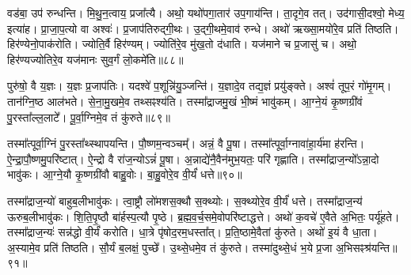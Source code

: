 वड॑बा॒ उप॑ रुन्धन्ति।
मि॒थु॒न॒त्वाय॒ प्रजा᳚त्यै।
अथो॒ यथो॑पगा॒तार॑ उप॒गाय॑न्ति।
ता॒दृगे॒व तत्।
उद॑गासी॒दश्वो॒ मेध्य॒ इत्या॑ह।
प्रा॒जा॒प॒त्यो वा अश्वः॑।
प्र॒जाप॑तिरुद्गी॒थः।
उ॒द्गी॒थमे॒वाव॑ रुन्धे।
अथो॑ ऋख्सा॒मयो॑रे॒व प्रति॑ तिष्ठति।
हिर॑ण्येनो॒पाक॑रोति।
ज्योति॒र्वै हिर॑ण्यम्।
ज्योति॑रे॒व मु॑ख॒तो द॑धाति।
यज॑माने च प्र॒जासु॑ च।
अथो॒ हिर॑ण्यज्योतिरे॒व यज॑मानः सुव॒र्गं लो॒कमे॑ति॥८८॥\anuvakamend[तथ्स उ॒पाक॑रोति च॒त्वारि॑ च]

पुरु॑षो॒ वै य॒ज्ञः।
य॒ज्ञः प्र॒जाप॑तिः।
यदश्वे॑ प॒शून्नि॑यु॒ञ्जन्ति॑।
य॒ज्ञादे॒व तद्य॒ज्ञं प्रयु॑ङ्क्ते।
अश्वं॑ तूप॒रं गो॑मृ॒गम्।
तान॑ग्नि॒ष्ठ आल॑भते।
से॒ना॒मु॒खमे॒व तथ्सꣴश्य॑ति।
तस्मा᳚द्राजमु॒खं भी॒ष्मं भावु॑कम्।
आ॒ग्ने॒यं कृ॒ष्णग्री॑वं पु॒रस्ता᳚ल्ल॒लाटे᳚।
पू॒र्वा॒ग्निमे॒व तं कु॑रुते॥८९॥

तस्मा᳚त्पूर्वा॒ग्निं पु॒रस्ता᳚थ्स्थापयन्ति।
पौ॒ष्णम॒न्वञ्चम्᳚।
अन्नं॒ वै पू॒षा।
तस्मा᳚त्पूर्वा॒ग्नावा॑हा॒र्य॑मा ह॑रन्ति।
ऐ॒न्द्रा॒पौ॒ष्णमु॒परि॑ष्टात्।
ऐ॒न्द्रो वै रा॑ज॒न्यो\-ऽन्नं॑ पू॒षा।
अ॒न्नाद्ये॑नै॒वैन॑मुभ॒यतः॒ परि॑ गृह्णाति।
तस्मा᳚द्राज॒न्यो᳚\-ऽन्ना॒दो भावु॑कः।
आ॒ग्ने॒यौ कृ॒ष्णग्री॑वौ बाहु॒वोः।
बा॒हु॒वोरे॒व वी॒र्यं॑ धत्ते॥९०॥

तस्मा᳚द्राज॒न्यो॑ बाहुब॒लीभावु॑कः।
त्वा॒ष्ट्रौ लो॑मशस॒क्थौ स॒क्थ्योः।
स॒क्थ्योरे॒व वी॒र्यं॑ धत्ते।
तस्मा᳚द्राज॒न्य॑ ऊरुब॒लीभावु॑कः।
शि॒ति॒पृ॒ष्ठौ बा॑र्\mbox{}हस्प॒त्यौ पृ॒ष्ठे।
ब्र॒ह्म॒व॒र्च॒समे॒वोपरि॑ष्टाद्धत्ते।
अथो॑ क॒वचे॑ ए॒वैते अ॒भितः॒ पर्यू॑हते।
तस्मा᳚द्राज॒न्यः॑ सन्न॑द्धो वी॒र्यं॑ करोति।
धा॒त्रे पृ॑षोद॒रम॒धस्ता᳚त्।
प्र॒ति॒ष्ठामे॒वैतां कु॑रुते।
अथो॑ इ॒यं वै धा॒ता।
अ॒स्यामे॒व प्रति॑ तिष्ठति।
सौ॒र्यं ब॒लक्षं॒ पुच्छे᳚।
उ॒थ्से॒धमे॒व तं कु॑रुते।
तस्मा॑दुथ्से॒धं भ॒ये प्र॒जा अ॒भिसꣴश्र॑यन्ति॥९१॥\anuvakamend[कु॒रु॒ते॒ ध॒त्ते॒ कु॒रु॒ते॒ पञ्च॑ च]




\setcounter{anuvakam}{0}

